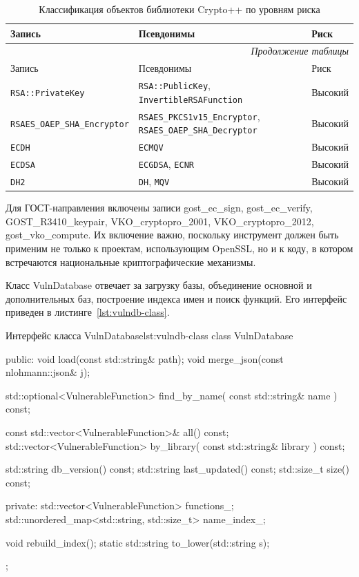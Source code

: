 \documentclass{itmo-vkr}
\begin{document}
\begin{longtable}{|p{6.7cm}|p{6.6cm}|l|}
	\caption{Классификация объектов библиотеки Crypto++ по уровням риска} \label{tab:crypto} \\
	\hline
	Запись & Псевдонимы & Риск \\ \hline
	\endfirsthead
	
	\multicolumn{3}{r}{\textit{Продолжение таблицы \thetable}} \\ \hline
	Запись & Псевдонимы & Риск \\ \hline
	\endhead
	
	\hline
	\endlastfoot
	
	\texttt{RSA::PrivateKey} & \texttt{RSA::PublicKey}, \texttt{InvertibleRSAFunction} & Высокий \\ \hline
	\texttt{RSAES\_OAEP\_SHA\_Encryptor} & \texttt{RSAES\_PKCS1v15\_Encryptor}, \texttt{RSAES\_OAEP\_SHA\_Decryptor} & Высокий \\ \hline
	\texttt{ECDH} & \texttt{ECMQV} & Высокий \\ \hline
	\texttt{ECDSA} & \texttt{ECGDSA}, \texttt{ECNR} & Высокий \\ \hline
	\texttt{DH2} & \texttt{DH}, \texttt{MQV} & Высокий
\end{longtable}


Для ГОСТ-направления включены записи gost\_ec\_sign, gost\_ec\_verify, GOST\_R3410\_keypair, VKO\_cryptopro\_2001, VKO\_cryptopro\_2012, gost\_vko\_compute. Их включение важно, поскольку инструмент должен быть применим не только к проектам, использующим OpenSSL, но и к коду, в котором встречаются национальные криптографические механизмы.

Класс VulnDatabase отвечает за загрузку базы, объединение основной и дополнительных баз, построение индекса имен и поиск функций. Его интерфейс приведен в листинге~\ref{lst:vulndb-class}.

\begin{itmolisting}[C++]{Интерфейс класса VulnDatabase}{lst:vulndb-class}
class VulnDatabase {
    public:
    void load(const std::string& path);
    void merge_json(const nlohmann::json& j);

    std::optional<VulnerableFunction> find_by_name(
    const std::string& name
    ) const;
    
    const std::vector<VulnerableFunction>& all() const;
    std::vector<VulnerableFunction> by_library(
    const std::string& library
    ) const;
    
    std::string db_version() const;
    std::string last_updated() const;
    std::size_t size() const;
    
    private:
    std::vector<VulnerableFunction> functions_;
    std::unordered_map<std::string, std::size_t> name_index_;
    
    void rebuild_index();
    static std::string to_lower(std::string s);
};
\end{itmolisting}
\end{document}
